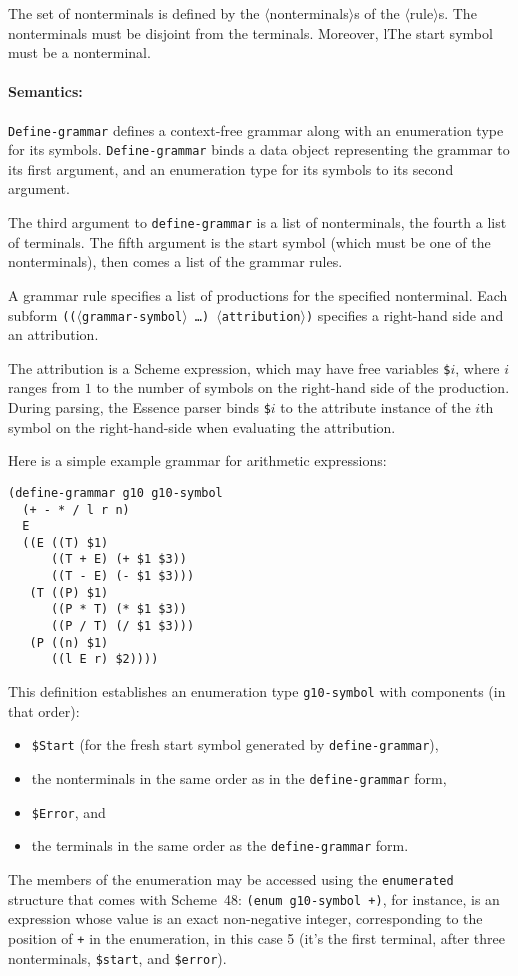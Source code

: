 \documentclass{article}
\newcommand{\meta}[1]{\textrm{$\langle$#1$\rangle$}}
\newcommand{\dotsfoo}{\ldots\thinspace}
\newcommand{\codefont}[1]{\texttt{#1}}
\begin{document}
The set of nonterminals is defined by the \meta{nonterminals}s of the
\meta{rule}s.  The nonterminals must be disjoint from the terminals.
Moreover, lThe start symbol must be a nonterminal.

\paragraph{Semantics:} \codefont{Define-grammar} defines a
context-free grammar along with an enumeration type for its symbols.
\codefont{Define-grammar} binds a data object representing the grammar 
to its first argument, and an enumeration type for its symbols to its
second argument.

The third argument to \codefont{define-grammar} is a list of
nonterminals, the fourth a list of terminals.  The fifth argument is
the start symbol (which must be one of the nonterminals), then comes a
list of the grammar rules.

A grammar rule specifies a list of productions for the specified
nonterminal.  Each subform \texttt{((\meta{grammar-symbol} \dotsfoo)
  \meta{attribution})}
specifies a right-hand side and an attribution.

The attribution is a Scheme expression, which may have free variables
\codefont{\$}$i$, where $i$ ranges from $1$ to the number of symbols
on the right-hand side of the production.  During parsing, the Essence
parser binds \codefont{\$}$i$ to the attribute instance of the $i$th
symbol on the right-hand-side when evaluating the attribution.

Here is a simple example grammar for arithmetic expressions:
%
\begin{verbatim}
(define-grammar g10 g10-symbol
  (+ - * / l r n)
  E
  ((E ((T) $1)
      ((T + E) (+ $1 $3))
      ((T - E) (- $1 $3)))
   (T ((P) $1)
      ((P * T) (* $1 $3))
      ((P / T) (/ $1 $3)))
   (P ((n) $1)
      ((l E r) $2))))
\end{verbatim}
%
This definition establishes an enumeration type \codefont{g10-symbol}
with components (in that order):
%
\label{list:grammar-enum}
%
\begin{itemize}
\item \codefont{\$Start} (for the fresh start symbol generated by
  \codefont{define-grammar}),
\item the nonterminals in the same order as in the
  \codefont{define-grammar} form,
\item \codefont{\$Error}, and
\item the terminals in the same order as the \codefont{define-grammar}
  form.
\end{itemize}
%
The members of the enumeration may be accessed using the
\codefont{enumerated} structure that comes with Scheme~48:
\codefont{(enum g10-symbol +)}, for instance, is an expression whose
value is an exact non-negative integer, corresponding to the position
of \codefont{+} in the enumeration, in this case 5 (it's the first
terminal, after three nonterminals, \codefont{\$start}, and
\codefont{\$error}).
\end{document}
